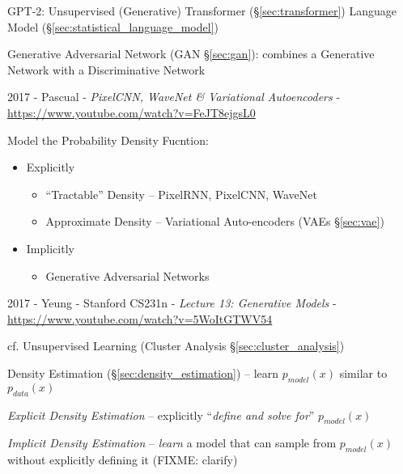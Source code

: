 GPT-2: Unsupervised (Generative) Transformer (\S\ref{sec:transformer}) Language
Model (\S\ref{sec:statistical_language_model})

\fist Generative Adversarial Network (GAN \S\ref{sec:gan}): combines a
Generative Network with a Discriminative Network

2017 - Pascual - \emph{PixelCNN, WaveNet \& Variational Autoencoders} -
\url{https://www.youtube.com/watch?v=FeJT8ejgsL0}

Model the Probability Density Fucntion:
\begin{itemize}
  \item Explicitly
    \begin{itemize}
      \item ``Tractable'' Density -- PixelRNN, PixelCNN, WaveNet
      \item Approximate Density -- Variational Auto-encoders (VAEs
        \S\ref{sec:vae})
    \end{itemize}
  \item Implicitly
    \begin{itemize}
      \item Generative Adversarial Networks
    \end{itemize}
\end{itemize}

2017 - Yeung - Stanford CS231n - \emph{Lecture 13: Generative Models} -
\url{https://www.youtube.com/watch?v=5WoItGTWV54}

cf. Unsupervised Learning (Cluster Analysis \S\ref{sec:cluster_analysis})

Density Estimation (\S\ref{sec:density_estimation}) -- learn $p_{model}(x)$
similar to $p_{data}(x)$

\emph{Explicit Density Estimation} -- explicitly ``\emph{define and solve for}''
$p_{model}(x)$

\emph{Implicit Density Estimation} -- \emph{learn} a model that can sample from
$p_{model}(x)$ without explicitly defining it (FIXME: clarify)

